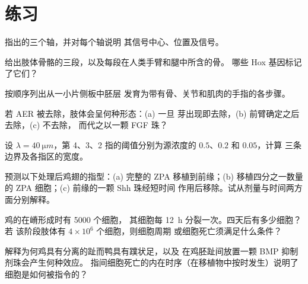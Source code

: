 \section{练习}

\begin{exercise}[$\star$]\label{exo:b2:limb-organogenesis:1}
指出的三个轴，并对每个轴说明
其信号中心、位置及信号。
\end{exercise}

\begin{exercise}[$\star$]\label{exo:b2:limb-organogenesis:2}
给出肢体骨骼的三段，以及每段在人类手臂和腿中所含的骨。
哪些 Hox 基因标记了它们？
\end{exercise}

\begin{exercise}[$\star$]\label{exo:b2:limb-organogenesis:3}
按顺序列出从一小片侧板中胚层
发育为带有骨、关节和肌肉的手指的各步骤。
\end{exercise}

\begin{exercise}[$\star$]\label{exo:b2:limb-organogenesis:4}
若 AER 被去除，肢体会呈何种形态：(a) 一旦
芽出现即去除，(b) 前臂确定之后去除，(c) 不去除，
而代之以一颗 FGF 珠？
\end{exercise}

\begin{exercise}[$\star\star$]\label{exo:b2:limb-organogenesis:5}
设 $\lambda = \qty{40}{\micro m}$，第 4、3、2 指的阈值分别为源浓度的 $0.5$、$0.2$
和 $0.05$，计算
三条边界及各指区的宽度。
\end{exercise}

\begin{exercise}[$\star\star$]\label{exo:b2:limb-organogenesis:6}
预测以下处理后鸡翅的指型：(a) 完整的 ZPA
移植到前缘；(b) 移植四分之一数量的
ZPA 细胞；(c) 前缘的一颗 Shh 珠经短时间
作用后移除。试从剂量与时间两方面分别解释。
\end{exercise}

\begin{exercise}[$\star\star$]\label{exo:b2:limb-organogenesis:7}
鸡的在嵴形成时有 \num{5000} 个细胞，
其细胞每 \qty{12}{h} 分裂一次。四天后有多少细胞？若
该阶段肢体有 $4\times 10^{6}$ 个细胞，则细胞周期
或细胞死亡须满足什么条件？
\end{exercise}

\begin{exercise}[$\star\star$]\label{exo:b2:limb-organogenesis:8}
解释为何鸡具有分离的趾而鸭具有蹼状足，以及
在鸡胚趾间放置一颗 BMP 抑制剂珠会产生何种效应。
指间细胞死亡的内在时序（在移植物中按时发生）说明了
细胞是如何被指令的？
\end{exercise}

